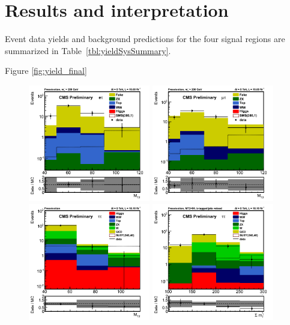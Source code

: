 \section{Results and interpretation}
\label{sect:stat}
Event data yields and background predictions for the four signal regions are summarized in Table~\ref{tbl:yieldSysSummary}.

Figure \ref{fig:yield_final}
\begin{figure}[!Hhtb]
\centering
\includegraphics[width=0.475\textwidth,keepaspectratio=true]{StatisticsFig/MT2_tauMTgt200_DDFakeEleTau.png}
\includegraphics[width=0.475\textwidth,keepaspectratio=true]{StatisticsFig/MT2muTau_tauMTgt200_DDFake.png}
\includegraphics[width=0.475\textwidth,keepaspectratio=true]{StatisticsFig/QCDWestimation_bin1.png}
\includegraphics[width=0.475\textwidth,keepaspectratio=true]{StatisticsFig/QCDWestimation_bin2.png}

\end{figure}
